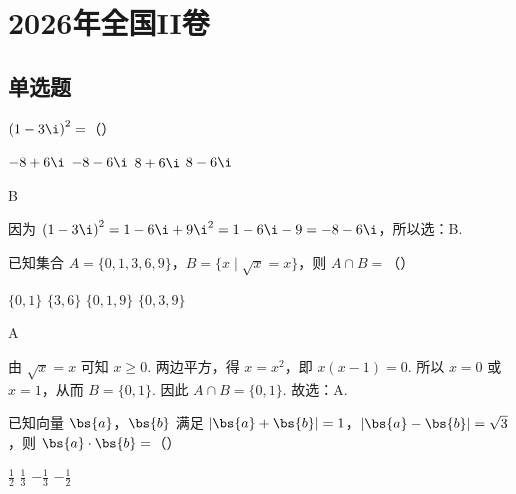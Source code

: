 \documentclass[UTF8,a4paper,oneside,11pt]{ctexbook}
\begin{document}
\mainmatter

\chapter{2026年全国II卷}

\section{单选题}

\begin{problem}
\(\left( 1-3\i \right)^2=\)（\quad）

\choices
    {\(-8+6\i\)}
    {\(-8-6\i\)}
    {\(8+6\i\)}
    {\(8-6\i\)}
\end{problem}

\begin{answer}
B
\end{answer}

\begin{solution}
因为 \(\left( 1-3\i \right)^2=1-6\i+9\i^2=1-6\i-9=-8-6\i\)，所以选：B.
\end{solution}

\begin{problem}
已知集合 \(A=\{0,1,3,6,9\}\)，\(B=\{x \mid \sqrt{x}=x\}\)，则 \(A\cap B=\)（\quad）

\choices
    {\(\{0,1\}\)}
    {\(\{3,6\}\)}
    {\(\{0,1,9\}\)}
    {\(\{0,3,9\}\)}
\end{problem}

\begin{answer}
A
\end{answer}

\begin{solution}
由 \(\sqrt{x}=x\) 可知 \(x\ge 0\). 两边平方，得 \(x=x^2\)，即 \(x\left( x-1 \right)=0\). 所以 \(x=0\) 或 \(x=1\)，从而 \(B=\{0,1\}\). 因此 \(A\cap B=\{0,1\}\). 故选：A.
\end{solution}

\begin{problem}
已知向量 \(\bs{a}\)，\(\bs{b}\) 满足 \(\left| \bs{a}+\bs{b} \right|=1\)，\(\left| \bs{a}-\bs{b} \right|=\sqrt{3}\)，则 \(\bs{a}\cdot \bs{b}=\)（\quad）

\choices
    {\(\frac{1}{2}\)}
    {\(\frac{1}{3}\)}
    {\(-\frac{1}{3}\)}
    {\(-\frac{1}{2}\)}
\end{problem}
\end{document}
